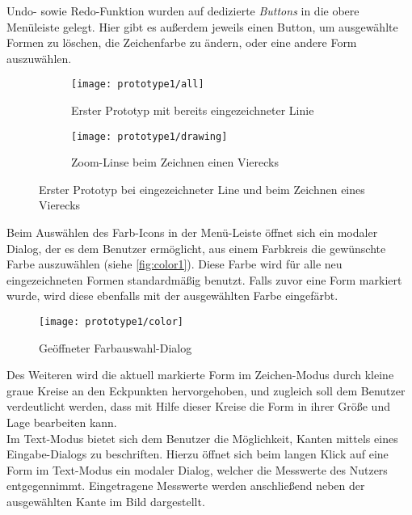 Undo- sowie Redo-Funktion wurden auf dedizierte \emph{Buttons} in die obere Menüleiste gelegt.
Hier gibt es außerdem jeweils einen Button, um ausgewählte Formen zu löschen, die Zeichenfarbe zu ändern, oder eine andere Form auszuwählen. \\

\begin{figure}[h]
  \begin{subfigure}[t]{0.4\textwidth}
    \texttt{[image: prototype1/all]}
    \caption{Erster Prototyp mit bereits eingezeichneter Linie}
    \label{fig:all1}
  \end{subfigure}
  \begin{subfigure}[t]{0.4\textwidth}
    \texttt{[image: prototype1/drawing]}
    \caption{Zoom-Linse beim Zeichnen einen Vierecks}
    \label{fig:draw1}
  \end{subfigure}
  \centering
  \caption{Erster Prototyp bei eingezeichneter Line und beim Zeichnen eines Vierecks}
\end{figure}

\noindent
Beim Auswählen des Farb-Icons in der Menü-Leiste öffnet sich ein modaler Dialog, der es dem Benutzer ermöglicht, aus einem Farbkreis die gewünschte Farbe auszuwählen (siehe \autoref{fig:color1}).
Diese Farbe wird für alle neu eingezeichneten Formen standardmäßig benutzt.
Falls zuvor eine Form markiert wurde, wird diese ebenfalls mit der ausgewählten Farbe eingefärbt.

\begin{wrapfigure}{R}{0.5\textwidth}
  \centering
  \texttt{[image: prototype1/color]}
  \caption{Geöffneter Farbauswahl-Dialog}
  \label{fig:color1}
\end{wrapfigure}

Des Weiteren wird die aktuell markierte Form im Zeichen-Modus durch kleine graue Kreise an den Eckpunkten hervorgehoben, und zugleich soll dem Benutzer verdeutlicht werden, dass mit Hilfe dieser Kreise die Form in ihrer Größe und Lage bearbeiten kann. \\

Im Text-Modus bietet sich dem Benutzer die Möglichkeit, Kanten mittels eines Eingabe-Dialogs zu beschriften.
Hierzu öffnet sich beim langen Klick auf eine Form im Text-Modus ein modaler Dialog, welcher die Messwerte des Nutzers entgegennimmt.
Eingetragene Messwerte werden anschließend neben der ausgewählten Kante im Bild dargestellt. \\

